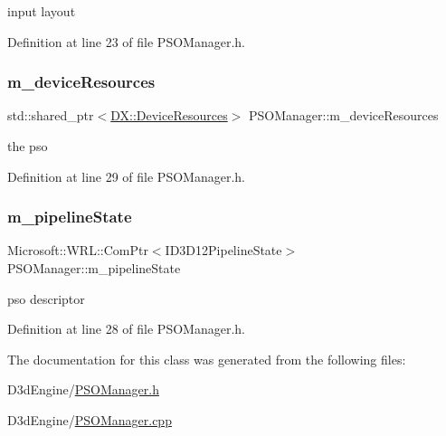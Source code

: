 input layout 



Definition at line 23 of file P\+S\+O\+Manager.\+h.

\mbox{\label{class_p_s_o_manager_a0ea4be81328632e56d764e065b2af0af}} 
\subsubsection{\texorpdfstring{m\+\_\+device\+Resources}{m\_deviceResources}}
{\footnotesize\ttfamily std\+::shared\+\_\+ptr$<$\mbox{\hyperlink{class_d_x_1_1_device_resources}{D\+X\+::\+Device\+Resources}}$>$ P\+S\+O\+Manager\+::m\+\_\+device\+Resources\hspace{0.3cm}{\ttfamily [private]}}



the pso 



Definition at line 29 of file P\+S\+O\+Manager.\+h.

\mbox{\label{class_p_s_o_manager_aa34b6aa764012d33591474b456d1bfb7}} 
\subsubsection{\texorpdfstring{m\+\_\+pipeline\+State}{m\_pipelineState}}
{\footnotesize\ttfamily Microsoft\+::\+W\+R\+L\+::\+Com\+Ptr$<$I\+D3\+D12\+Pipeline\+State$>$ P\+S\+O\+Manager\+::m\+\_\+pipeline\+State\hspace{0.3cm}{\ttfamily [private]}}



pso descriptor 



Definition at line 28 of file P\+S\+O\+Manager.\+h.



The documentation for this class was generated from the following files\+:\begin{DoxyCompactItemize}
\item 
D3d\+Engine/\mbox{\hyperlink{_p_s_o_manager_8h}{P\+S\+O\+Manager.\+h}}\item 
D3d\+Engine/\mbox{\hyperlink{_p_s_o_manager_8cpp}{P\+S\+O\+Manager.\+cpp}}\end{DoxyCompactItemize}
